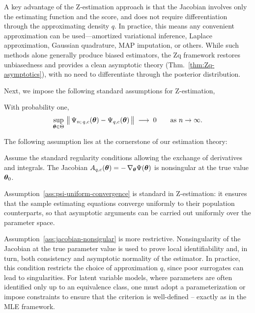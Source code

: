 \documentclass[twoside,11pt]{article}
\begin{document}
\begin{remark}
A key advantage of the Z-estimation approach is that the Jacobian involves only the 
estimating function and the score, and does not require differentiation through the 
approximating density $q$. In practice, this means any convenient approximation can be 
used—amortized variational inference, Laplace approximation, Gaussian quadrature, 
MAP imputation, or others. While such methods alone generally produce biased estimators, 
the Zq framework restores unbiasedness and provides a clean asymptotic theory 
(Thm.~\ref{thm:Zq-asymptotics}), with no need to differentiate through the posterior distribution.
\end{remark}



Next, we impose the following standard assumptions for Z-estimation,

\begin{assumption}
With probability one,
\[
\sup_{{\bm{\theta}} \in \Theta}\,
\big\|\,\Psi_{n;\,q,c}({\bm{\theta}})-\Psi_{q,c}({\bm{\theta}})\,\big\|
\;\longrightarrow\;0 \qquad \text{as } n\to\infty.
\]
\label{ass:psi-uniform-convergence}
\end{assumption}
%
The following assumption lies at the cornerstone of our estimation theory:
%
\begin{assumption}[Nonsingularity]
    Assume the standard regularity conditions allowing the exchange of derivatives and integrals.    The Jacobian 
    \(
        A_{q,c}({\bm{\theta}}) = -\,\nabla_{\bm{\theta}} \Psi({\bm{\theta}})
    \)
    is nonsingular at the true value ${\bm{\theta}}_0$.
    \label{ass:jacobian-nonsigular}
\end{assumption}


\noindent Assumption~\ref{ass:psi-uniform-convergence} is standard in Z-estimation: it ensures that the sample estimating equations converge uniformly to their population counterparts, so that asymptotic arguments can be carried out uniformly over the parameter space.  

Assumption~\ref{ass:jacobian-nonsigular} is more restrictive. Nonsingularity of the Jacobian at the true parameter value is used to prove local identifiability and, in turn, both consistency and asymptotic normality of the estimator. In practice, this condition restricts the choice of approximation $q$, since poor surrogates can lead to singularities. For latent variable models, where parameters are often identified only up to an equivalence class, one must adopt a parameterization or impose constraints to ensure that the criterion is well-defined -- exactly as in the MLE framework.  
\end{document}

